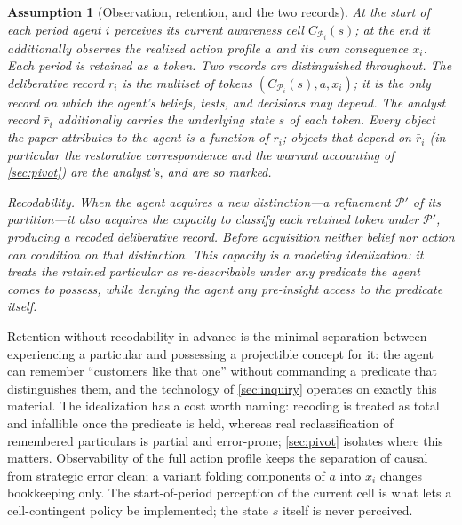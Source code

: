 \documentclass[11pt]{article}
\newtheorem{assumption}{Assumption}[section]
\theoremstyle{definition}
\begin{document}
\begin{assumption}[Observation, retention, and the two records]
\label{ass:observation}
At the start of each period agent $i$ perceives its current awareness cell $C_{\mathcal P_i}(s)$; at the end it additionally observes the realized action profile $a$ and its own consequence $x_i$.
Each period is retained as a token.
Two records are distinguished throughout.
The \emph{deliberative record} $r_i$ is the multiset of tokens $(C_{\mathcal P_i}(s),a,x_i)$; it is the only record on which the agent's beliefs, tests, and decisions may depend.
The \emph{analyst record} $\bar r_i$ additionally carries the underlying state $s$ of each token.
Every object the paper attributes to the agent is a function of $r_i$; objects that depend on $\bar r_i$ (in particular the restorative correspondence and the warrant accounting of \cref{sec:pivot}) are the analyst's, and are so marked.

\emph{Recodability.}
When the agent acquires a new distinction---a refinement $\mathcal P'$ of its partition---it also acquires the capacity to classify each retained token under $\mathcal P'$, producing a recoded deliberative record.
Before acquisition neither belief nor action can condition on that distinction.
This capacity is a modeling idealization: it treats the retained particular as re-describable under any predicate the agent comes to possess, while denying the agent any pre-insight access to the predicate itself.
\end{assumption}

Retention without recodability-in-advance is the minimal separation between experiencing a particular and possessing a projectible concept for it: the agent can remember ``customers like that one'' without commanding a predicate that distinguishes them, and the technology of \cref{sec:inquiry} operates on exactly this material.
The idealization has a cost worth naming: recoding is treated as total and infallible once the predicate is held, whereas real reclassification of remembered particulars is partial and error-prone; \cref{sec:pivot} isolates where this matters.
Observability of the full action profile keeps the separation of causal from strategic error clean; a variant folding components of $a$ into $x_i$ changes bookkeeping only.
The start-of-period perception of the current cell is what lets a cell-contingent policy be implemented; the state $s$ itself is never perceived.
\end{document}
